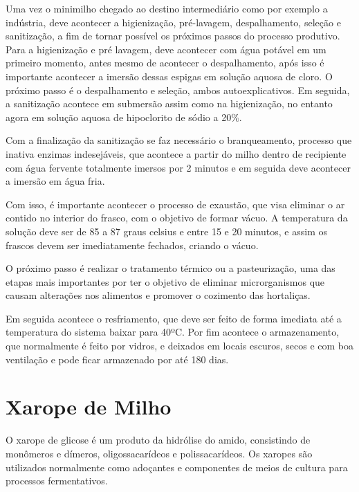\documentclass[
	12pt,				%
	openright,			%
	oneside,			%
	a4paper,			%
	english,			%
	french,				%
	spanish,			%
	brazil				%
	]{abntex2}
\begin{document}
Uma vez o minimilho chegado ao destino intermediário como por exemplo a indústria, deve acontecer a higienização, pré-lavagem, despalhamento, seleção e sanitização, a fim de tornar possível os próximos passos do processo produtivo. Para a higienização e pré lavagem, deve acontecer com água potável em um primeiro momento, antes mesmo de acontecer o despalhamento, após isso é importante acontecer a imersão dessas espigas em solução aquosa de cloro. O próximo passo é o despalhamento e seleção, ambos autoexplicativos. Em seguida, a sanitização acontece em submersão assim como na higienização, no entanto agora em solução aquosa de hipoclorito de sódio a 20$\%$. \cite{queiroz2010processo}
	
	Com a finalização da sanitização se faz necessário o branqueamento, processo que inativa enzimas indesejáveis, que acontece a partir do milho dentro de recipiente com água fervente totalmente imersos por 2 minutos e em seguida deve acontecer a imersão em água fria.
	
	Com isso, é importante acontecer o processo de exaustão, que visa eliminar o ar contido no interior do frasco, com o objetivo de formar vácuo. A temperatura da solução deve ser de 85 a 87 graus celsius e entre 15 e 20 minutos, e assim os frascos devem ser imediatamente fechados, criando o vácuo. \cite{queiroz2010processo}
	
	O próximo passo é realizar o tratamento térmico ou a pasteurização, uma das etapas mais importantes por ter o objetivo de eliminar microrganismos que causam alterações nos alimentos e promover o cozimento das hortaliças.
	
	Em seguida acontece o resfriamento, que deve ser feito de forma imediata até a temperatura do sistema baixar para 40ºC.
Por fim acontece o armazenamento, que normalmente é feito por vidros, e deixados em locais escuros, secos e com boa ventilação e pode ficar armazenado por até 180 dias. \cite{queiroz2010processo}


\section{Xarope de Milho}

O xarope de glicose é um produto da hidrólise do amido, consistindo de monômeros e dímeros, oligossacarídeos e polissacarídeos.
Os xaropes são utilizados normalmente como adoçantes e componentes de meios de cultura para processos fermentativos.
\end{document}
